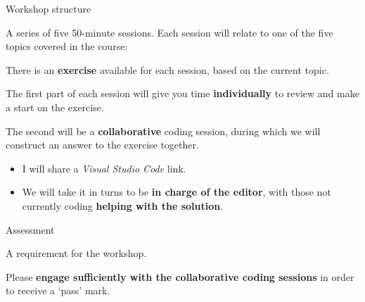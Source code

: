 \documentclass[10pt, dvipsnames, table, aspectratio=169]{beamer}
\begin{document}
\begin{frame}{Workshop structure}

A series of five 50-minute sessions.
Each session will relate to one of the five topics covered in the course:

\begin{centering}

\begin{table}[h!]

    \centering

    

\end{table}

\end{centering}

\framebreak

There is an \textbf{exercise} available for each session, based on the current topic.

The first part of each session will give you time \textbf{individually} to review and make a start on the exercise.

The second will be a \textbf{collaborative} coding session, during which we will construct an answer to the exercise together.

\begin{itemize}

  \item I will share a \emph{Visual Studio Code} link.

  \item We will take it in turns to be \textbf{in charge of the editor}, with those not currently coding \textbf{helping with the solution}.

\end{itemize}

\end{frame}


\begin{frame}[fragile]{Assessment}

A requirement for the workshop.

Please \textbf{engage sufficiently with the collaborative coding sessions} in order to receive a `pass' mark.

\end{frame}

\end{document}
